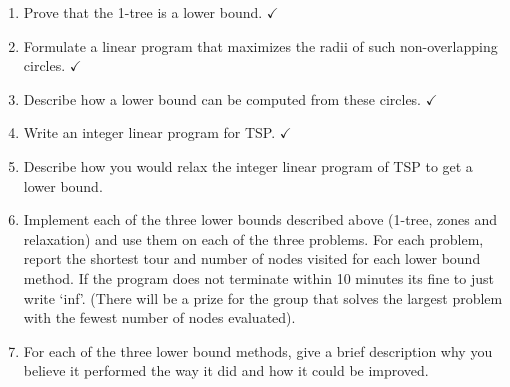\documentclass{article}
\begin{document}
\newpage
\begin{enumerate}
  \item Prove that the 1-tree is a lower bound. $\checkmark$
  \item Formulate a linear program that maximizes the radii of such
    non-overlapping circles. $\checkmark$
  \item Describe how a lower bound can be computed from these circles. $\checkmark$
  \item Write an integer linear program for TSP. $\checkmark$
  \item Describe how you would relax the integer linear program of TSP to get a lower bound.
  \item Implement each of the three lower bounds described above (1-tree, zones and relaxation) and use them on each of the three problems. For each problem, report the shortest tour and number of nodes visited for each lower bound method. If the program does not terminate within 10 minutes its fine to just write ‘inf’. (There will be a prize for the group that solves the largest problem with the fewest number of nodes evaluated).
  \item For each of the three lower bound methods, give a brief description why you believe it performed the way it did and how it could be improved. 
\end{enumerate}



\end{document}
